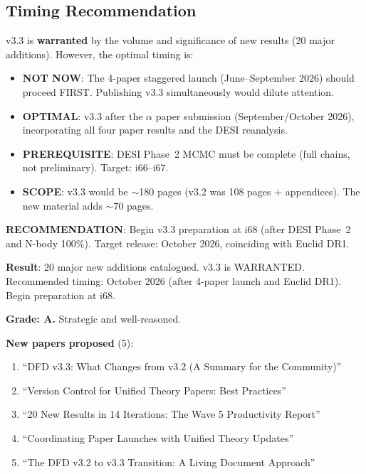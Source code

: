 \documentclass[11pt,a4paper]{article}
\begin{document}
\subsection{Timing Recommendation}

\begin{tcolorbox}[colback=yellow!5!white, colframe=yellow!60!black, title={v3.3 Readiness: YES, BUT WAIT}]
v3.3 is \textbf{warranted} by the volume and significance of new results (20 major additions). However, the optimal timing is:

\begin{itemize}
\item \textbf{NOT NOW}: The 4-paper staggered launch (June--September 2026) should proceed FIRST. Publishing v3.3 simultaneously would dilute attention.
\item \textbf{OPTIMAL}: v3.3 after the $\alpha$ paper submission (September/October 2026), incorporating all four paper results and the DESI reanalysis.
\item \textbf{PREREQUISITE}: DESI Phase~2 MCMC must be complete (full chains, not preliminary). Target: i66--i67.
\item \textbf{SCOPE}: v3.3 would be $\sim$180 pages (v3.2 was 108 pages + appendices). The new material adds $\sim$70 pages.
\end{itemize}

\textbf{RECOMMENDATION}: Begin v3.3 preparation at i68 (after DESI Phase~2 and N-body 100\%). Target release: October 2026, coinciding with Euclid DR1.
\end{tcolorbox}

\begin{tcolorbox}[colback=green!5!white, colframe=green!60!black, title={Agent 16: v3.3 Assessment COMPLETE}]
\textbf{Result}: 20 major new additions catalogued. v3.3 is WARRANTED. Recommended timing: October 2026 (after 4-paper launch and Euclid DR1). Begin preparation at i68.

\textbf{Grade: A.} Strategic and well-reasoned.

\textbf{New papers proposed} (5):
\begin{enumerate}
\item ``DFD v3.3: What Changes from v3.2 (A Summary for the Community)''
\item ``Version Control for Unified Theory Papers: Best Practices''
\item ``20 New Results in 14 Iterations: The Wave 5 Productivity Report''
\item ``Coordinating Paper Launches with Unified Theory Updates''
\item ``The DFD v3.2 to v3.3 Transition: A Living Document Approach''
\end{enumerate}
\end{tcolorbox}
\end{document}
